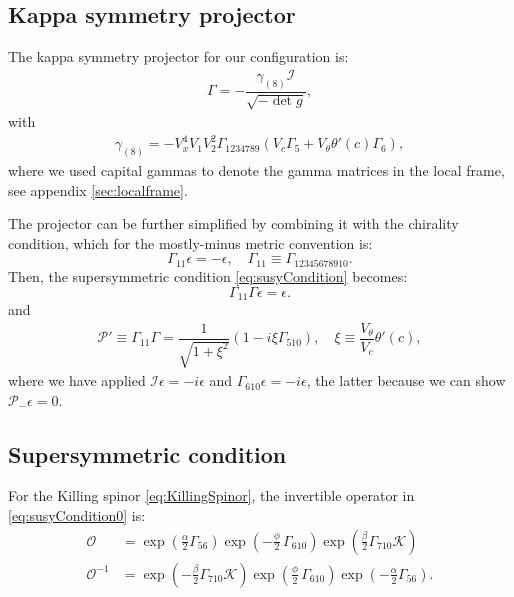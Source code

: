 \subsection{Kappa symmetry projector}

The kappa symmetry projector for our configuration is:
\begin{align}
\Gamma = - \dfrac{ \gamma_{(8)} \mathcal{I} }{\sqrt{-\det g}},
\end{align}
with
\begin{align}
 \gamma_{(8)} = - V_x^4 V_1 V_2^2 \Gamma_{1 2 3 4 7 8 9}( V_c \Gamma_5 +  V_{\theta} \theta'(c) \Gamma_6), 
\end{align}
where we used capital gammas to denote the gamma matrices in the local frame, see appendix \ref{sec:localframe}.

The projector can be further simplified by combining it with the chirality condition, which for the mostly-minus metric convention is: 
\begin{equation}
 \Gamma_{11} \epsilon = -\epsilon, \quad 
 \Gamma_{11} \equiv \Gamma_{12345678910}.
\end{equation}
Then, the supersymmetric condition \eqref{eq:susyCondition} becomes:
\begin{equation}
 \Gamma_{11} \Gamma \epsilon = \epsilon.
\end{equation}
and 
\begin{align} \label{eq:newProjector}
  \mathcal{P}' \equiv \Gamma_{11} \Gamma  = \dfrac{1}{\sqrt{1+\xi^2}}(1- i \xi  \Gamma_{510}), \quad 
   \xi \equiv  \dfrac{V_\theta}{V_c} \theta'(c),
\end{align}
where we have applied $\mathcal{I} \epsilon = -i\epsilon$ and $\Gamma_{610} \epsilon = -i \epsilon$, the latter because we can show $\mathcal{P}_- \epsilon =0$. 


\subsection{Supersymmetric condition}

For the Killing spinor \eqref{eq:KillingSpinor}, the invertible operator in \eqref{eq:susyCondition0} is:
\begin{align}
 \mathcal{O} &= \exp{\left(\frac{\alpha}{2}\Gamma_{56} \right)} \exp{\left(-\frac{\phi}{2}\, \Gamma_{610} \right)} \exp{\left(\frac{\beta}{2}\Gamma_{710} \mathcal{K} \right)} \\
 \mathcal{O}^{-1} &=  \exp{\left(-\frac{\beta}{2}\Gamma_{710} \mathcal{K} \right)} 
 \exp{\left(\frac{\phi}{2}\, \Gamma_{610} \right)} 
 \exp{\left(-\frac{\alpha}{2}\Gamma_{56} \right)}.
\end{align}


